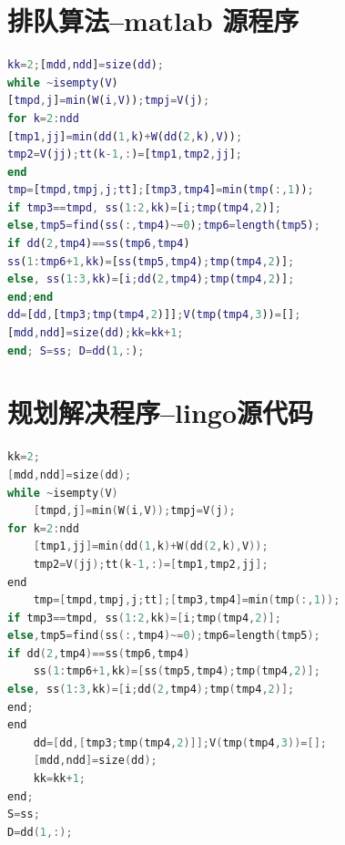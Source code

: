 \documentclass{cumcmthesis}
\begin{document}
\newpage
\begin{appendices}
\section{排队算法--matlab 源程序}
\begin{lstlisting}[language=matlab]
kk=2;[mdd,ndd]=size(dd);
while ~isempty(V)
[tmpd,j]=min(W(i,V));tmpj=V(j);
for k=2:ndd
[tmp1,jj]=min(dd(1,k)+W(dd(2,k),V));
tmp2=V(jj);tt(k-1,:)=[tmp1,tmp2,jj];
end
tmp=[tmpd,tmpj,j;tt];[tmp3,tmp4]=min(tmp(:,1));
if tmp3==tmpd, ss(1:2,kk)=[i;tmp(tmp4,2)];
else,tmp5=find(ss(:,tmp4)~=0);tmp6=length(tmp5);
if dd(2,tmp4)==ss(tmp6,tmp4)
ss(1:tmp6+1,kk)=[ss(tmp5,tmp4);tmp(tmp4,2)];
else, ss(1:3,kk)=[i;dd(2,tmp4);tmp(tmp4,2)];
end;end
dd=[dd,[tmp3;tmp(tmp4,2)]];V(tmp(tmp4,3))=[];
[mdd,ndd]=size(dd);kk=kk+1;
end; S=ss; D=dd(1,:);
 \end{lstlisting}
 \section{规划解决程序--lingo源代码}
\begin{lstlisting}[language=c]
kk=2;
[mdd,ndd]=size(dd);
while ~isempty(V)
    [tmpd,j]=min(W(i,V));tmpj=V(j);
for k=2:ndd
    [tmp1,jj]=min(dd(1,k)+W(dd(2,k),V));
    tmp2=V(jj);tt(k-1,:)=[tmp1,tmp2,jj];
end
    tmp=[tmpd,tmpj,j;tt];[tmp3,tmp4]=min(tmp(:,1));
if tmp3==tmpd, ss(1:2,kk)=[i;tmp(tmp4,2)];
else,tmp5=find(ss(:,tmp4)~=0);tmp6=length(tmp5);
if dd(2,tmp4)==ss(tmp6,tmp4)
    ss(1:tmp6+1,kk)=[ss(tmp5,tmp4);tmp(tmp4,2)];
else, ss(1:3,kk)=[i;dd(2,tmp4);tmp(tmp4,2)];
end;
end
    dd=[dd,[tmp3;tmp(tmp4,2)]];V(tmp(tmp4,3))=[];
    [mdd,ndd]=size(dd);
    kk=kk+1;
end;
S=ss;
D=dd(1,:);
 \end{lstlisting}
\end{appendices}
\end{document}
